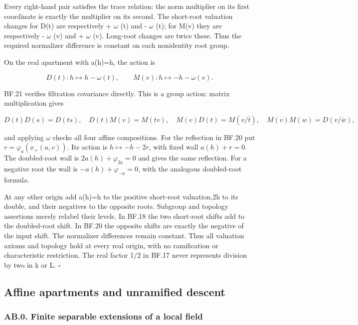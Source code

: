 \documentclass[
  11pt,
]{article}
\begin{document}
Every right-hand pair satisfies the trace relation: the norm multiplier
on its first coordinate is exactly the multiplier on its second. The
short-root valuation changes for D(t) are respectively + \(\omega\) (t)
and - \(\omega\) (t); for M(v) they are respectively - \(\omega\) (v)
and + \(\omega\) (v). Long-root changes are twice these. Thus the
required normalizer difference is constant on each nonidentity root
group.

On the real apartment with a(h)=h, the action is

\[
 D(t):h\mapsto h-\omega(t),\qquad
 M(v):h\mapsto-h-\omega(v).
 \tag{BF.22}
\]

BF.21 verifies filtration covariance directly. This is a group action:
matrix multiplication gives

\[
 D(t)D(s)=D(ts),\quad D(t)M(v)=M(tv),
 \quad M(v)D(t)=M(v/\bar t),\quad M(v)M(w)=D(v/\bar w),
\]

and applying \(\omega\) checks all four affine compositions. For the
reflection in BF.20 put \(r=\varphi_a(x_+(u,v))\). Its action is
\(h\mapsto-h-2r\), with fixed wall \(a(h)+r=0\). The doubled-root wall
is \(2a(h)+\varphi_{2a}=0\) and gives the same reflection. For a
negative root the wall is \(-a(h)+\varphi_{-a}=0\), with the analogous
doubled-root formula.

At any other origin add a(h)=h to the positive short-root valuation,2h
to its double, and their negatives to the opposite roots. Subgroup and
topology assertions merely relabel their levels. In BF.18 the two
short-root shifts add to the doubled-root shift. In BF.20 the opposite
shifts are exactly the negative of the input shift. The normalizer
differences remain constant. Thus all valuation axioms and topology hold
at every real origin, with no ramification or characteristic
restriction. The real factor 1/2 in BF.17 never represents division by
two in k or L. \(\square\)

\subsection{Affine apartments and unramified
descent}\label{affine-apartments-and-unramified-descent}

\subsubsection{AB.0. Finite separable extensions of a local
field}\label{ab.0.-finite-separable-extensions-of-a-local-field}
\end{document}
